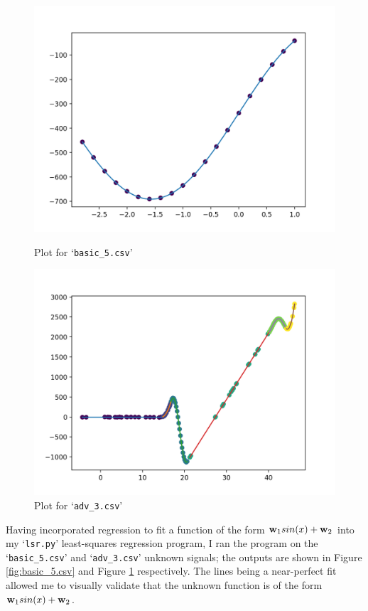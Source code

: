 \documentclass[onecolumn, 12pt, a4paper]{article}
\begin{document}
\begin{figure}[htbp]
\centering
\begin{minipage}[b]{.49\textwidth}
    \includegraphics[width=\textwidth]{images/basic_5.png}
    \caption{Plot for `\texttt{basic\_5.csv}'}
    \label{fig:basic_5.csv}
\end{minipage}
\hfill
\begin{minipage}[b]{.49\textwidth}
    \includegraphics[width=\textwidth]{images/adv_3.png}
    \caption{Plot for `\texttt{adv\_3.csv}'}
    \label{fig:adv_3.csv}
\end{minipage}
\end{figure}

Having incorporated regression to fit a function of the
form $\vb{w}_{1}sin(x) + \vb{w}_{2}$ into my 
`\texttt{lsr.py}'
least-squares regression program, I ran the program on
the `\texttt{basic\_5.csv}' and `\texttt{adv\_3.csv}'
unknown signals;
the outputs are shown in Figure \ref{fig:basic_5.csv}
and Figure \ref{fig:adv_3.csv} respectively.
The lines being a near-perfect fit allowed me to
visually validate that the unknown function is of
the form $\vb{w}_{1}sin(x) + \vb{w}_{2}$.
\end{document}

